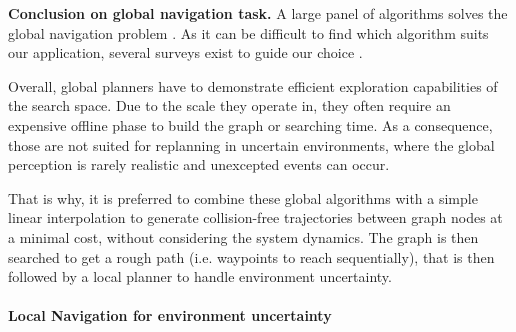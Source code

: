 

\noindent\textbf{Conclusion on global navigation task.}
A large panel of algorithms solves the global navigation problem \cite{motion_planning_latombe_1991, planning_algo_lavalle_2006, hauser_robotics_systems_draft}.
As it can be difficult to find which algorithm suits our application, several surveys exist to guide our choice \cite{yang_3D_path_planning_2016, Zammit2018ComparisonBA, patle_nav_mobile_robot_2019}.

Overall, global planners have to demonstrate efficient exploration capabilities of the search space.
Due to the scale they operate in, they often require an expensive offline phase to build the graph or searching time.
As a consequence, those are not suited for replanning in uncertain environments, where the global perception is rarely realistic and unexcepted events can occur.

That is why, it is preferred to combine these global algorithms with a simple linear interpolation to generate collision-free trajectories between graph nodes at a minimal cost, without considering the system dynamics. 
The graph is then searched to get a rough path (i.e. waypoints to reach sequentially), that is then followed by a local planner to handle environment uncertainty.



\paragraph{Local Navigation for environment uncertainty\label{subsub:nav:local}}\mbox{}\\


